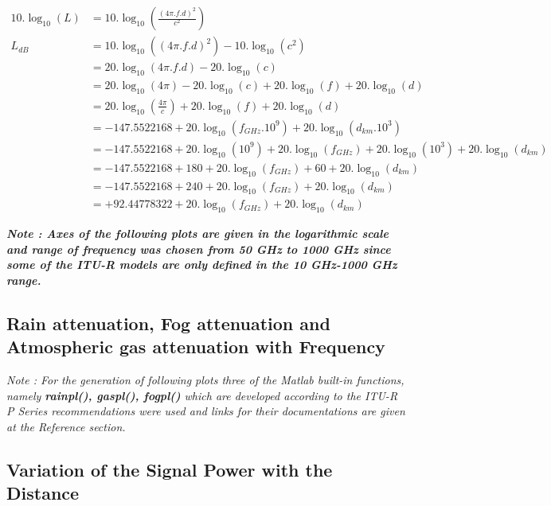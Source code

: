 \documentclass[a4paper,11pt]{article}%
\begin{document}
\[
\begin{split}
10.\log_{10}(L) &= 10.\log_{10}(\frac{(4\pi.f.d)^2}{c^2})\\
L_{dB}& = 10.\log_{10}((4\pi.f.d)^2) - 10.\log_{10}(c^2)\\
&=20.\log_{10}(4\pi.f.d)-20.\log_{10}(c)\\
&=20.\log_{10}(4\pi)-20.\log_{10}(c) + 20.\log_{10}(f) + 20.\log_{10}(d)\\
&=20.\log_{10}(\frac{4\pi}{c}) + 20.\log_{10}(f) + 20.\log_{10}(d)\\
&= -147.5522168 + 20.\log_{10}(f_{GHz}.10^9) + 20.\log_{10}(d_{km}.10^3)\\
& = -147.5522168 + 20.\log_{10}(10^9)+ 20.\log_{10}(f_{GHz}) + 20.\log_{10}(10^3) + 20.\log_{10}(d_{km})\\
&= -147.5522168 + 180+ 20.\log_{10}(f_{GHz}) + 60 + 20.\log_{10}(d_{km})\\
&= -147.5522168 + 240+ 20.\log_{10}(f_{GHz}) + 20.\log_{10}(d_{km})\\
&= +92.44778322+20.\log_{10}(f_{GHz}) + 20.\log_{10}(d_{km})
\end{split}
\]

\textbf{\textit{Note : Axes of the following plots are given in the logarithmic scale and range of frequency was chosen from 50 GHz to 1000 GHz since some of the ITU-R models are only defined in the 10 GHz-1000 GHz range.}}




\pagebreak
\subsection{Rain attenuation, Fog attenuation and Atmospheric gas attenuation with Frequency}

\textit{Note : For the generation of following plots three of the Matlab built-in functions, namely \textbf{rainpl()\cite{matlab}, gaspl()\cite{matlab}, fogpl()\cite{matlab}} which are developed according to the ITU-R P Series recommendations were used and links for their documentations are given at the Reference section.}


\subsection{Variation of the Signal Power with the Distance}
\end{document}
